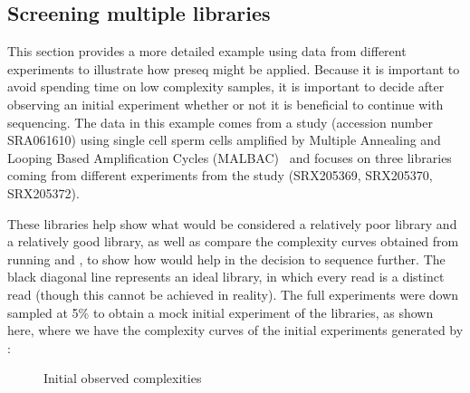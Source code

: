 \documentclass[11pt, titlepage]{article}
\begin{document}
\subsection*{Screening multiple libraries}
\label{sec:multlib}
This section provides a more detailed example using data from different experiments to illustrate how preseq might be applied. Because it is important to avoid spending time on low complexity samples, it is important to decide after observing an initial experiment whether or not it is beneficial to continue with sequencing. The data in this example comes from a study (accession number SRA061610) using single cell sperm cells amplified by Multiple Annealing and Looping Based Amplification Cycles (MALBAC)~\cite{lu2012probing} and focuses on three libraries coming from different experiments from the study (SRX205369, SRX205370, SRX205372). 

These libraries help show what would be considered a relatively poor library and a relatively good library, as well as compare the complexity curves obtained from running  and , to show how  would help in the decision to sequence further. The black diagonal line represents an ideal library, in which every read is a distinct read (though this cannot be achieved in reality). The full experiments were down sampled at 5\% to obtain a mock initial experiment of the libraries, as shown here, where we have the complexity curves  of the initial experiments generated by :
~\newline
\newline
\begin{figure}[h!]
\centering
{}
\caption{Initial observed complexities}
\end{figure}
\end{document}
